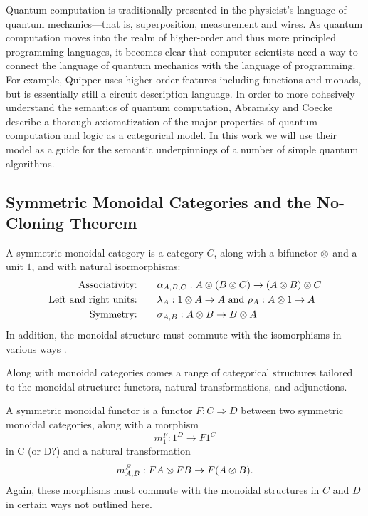 
Quantum computation is traditionally presented in the physicist's language
of quantum mechanics---that is, superposition, measurement and wires. 
As quantum computation moves into the realm of higher-order and thus more principled
programming languages, it becomes clear that computer scientists need a way to 
connect the language of quantum mechanics with the language of programming. 
For example, Quipper\cite{green13quipper} uses higher-order features including
functions and monads, but is essentially still a circuit description language.
In order to more cohesively understand the semantics of quantum computation,
Abramsky and Coecke\cite{abramsky2009categorical} describe a thorough 
axiomatization of the major properties of quantum computation and logic
as a categorical model. In this work we will use their model as a guide
for the semantic underpinnings of a number of simple quantum algorithms.


\subsection{Symmetric Monoidal Categories and the No-Cloning Theorem}

A symmetric monoidal category is a category $C$, along with a bifunctor $\otimes$
and a unit $1$, and with natural isormorphisms:
\begin{align*}
    \text{Associativity:}&\qquad 
    \alpha_{A,B,C} : A \otimes (B \otimes C) \rightarrow (A \otimes B) \otimes C \\
    \text{Left and right units:}&\qquad 
    \lambda_A : 1 \otimes A \rightarrow A \text{ and } \rho_A : A \otimes 1 \rightarrow A \\
    \text{Symmetry:}&\qquad 
    \sigma_{A,B} : A \otimes B \rightarrow B \otimes A \\
\end{align*}
In addition, the monoidal structure must commute with the isomorphisms in 
various ways .

Along with monoidal categories comes a range of categorical structures tailored
to the monoidal structure: functors, natural transformations, and adjunctions.

A symmetric monoidal functor is a functor $F : C \Rightarrow D$ between two symmetric
monoidal categories, along with a morphism
\[ m_1^F : 1^D \rightarrow F 1^C \]
in C (or D?) and a natural transformation
\[ m_{A,B}^F : F A \otimes F B \rightarrow F(A \otimes B). \]
Again, these morphisms must commute with the monoidal structures in $C$ and $D$
in certain ways not outlined here. 


